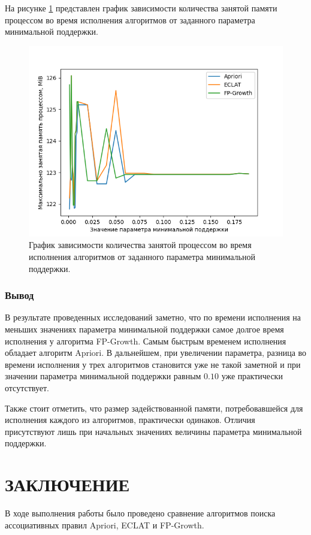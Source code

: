 \documentclass[12pt]{report}
\begin{document}
На рисунке \ref{img:memory} представлен график зависимости количества занятой памяти процессом во время исполнения алгоритмов от заданного параметра минимальной поддержки.


\begin{figure}[H]
	\centering
	\includegraphics[width=\textwidth]{mem.png}
	\caption{ График зависимости количества занятой процессом во время исполнения алгоритмов от заданного параметра минимальной поддержки.}
	\label{img:memory}
\end{figure}

\subsection*{Вывод}

В результате проведенных исследований заметно, что по времени исполнения на меньших значениях параметра минимальной поддержки самое долгое время исполнения у алгоритма FP-Growth. Самым быстрым временем исполнения обладает алгоритм Apriori. В дальнейшем, при увеличении параметра, разница во времени исполнения у трех алгоритмов становится уже не такой заметной и при значении параметра минимальной поддержки равным $0.10$ уже практически отсутствует.

Также стоит отметить, что размер задействованной памяти, потребовавшейся для исполнения каждого из алгоритмов, практически одинаков. Отличия присутствуют лишь при начальных значениях величины параметра минимальной поддержки.



\chapter*{ЗАКЛЮЧЕНИЕ}
В ходе выполнения работы было проведено сравнение алгоритмов поиска ассоциативных правил Apriori, ECLAT и FP-Growth.
\end{document}
